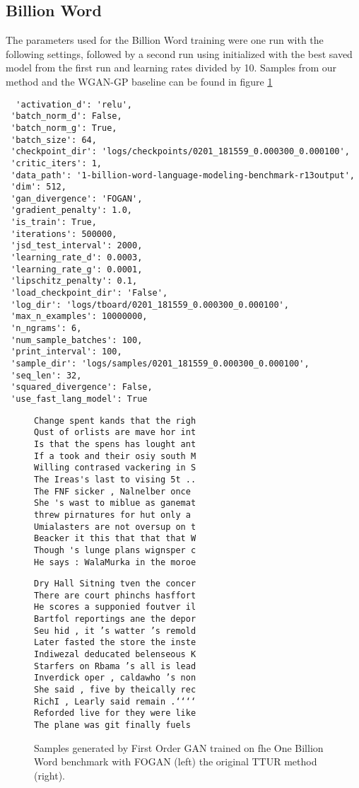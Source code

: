 \documentclass{article}
\begin{document}
 \subsection{Billion Word}\label{SS:appendix_billion_words}
 The parameters used for the Billion Word training were one run with the following settings, followed by
 a second run using initialized with the best saved model from the first run and learning rates divided by 10.
 Samples from our method and the WGAN-GP baseline can be found in figure \ref{F:billion_samples}
 
 \begin{verbatim}
  'activation_d': 'relu',
 'batch_norm_d': False,
 'batch_norm_g': True,
 'batch_size': 64,
 'checkpoint_dir': 'logs/checkpoints/0201_181559_0.000300_0.000100',
 'critic_iters': 1,
 'data_path': '1-billion-word-language-modeling-benchmark-r13output',
 'dim': 512,
 'gan_divergence': 'FOGAN',
 'gradient_penalty': 1.0,
 'is_train': True,
 'iterations': 500000,
 'jsd_test_interval': 2000,
 'learning_rate_d': 0.0003,
 'learning_rate_g': 0.0001,
 'lipschitz_penalty': 0.1,
 'load_checkpoint_dir': 'False',
 'log_dir': 'logs/tboard/0201_181559_0.000300_0.000100',
 'max_n_examples': 10000000,
 'n_ngrams': 6,
 'num_sample_batches': 100,
 'print_interval': 100,
 'sample_dir': 'logs/samples/0201_181559_0.000300_0.000100',
 'seq_len': 32,
 'squared_divergence': False,
 'use_fast_lang_model': True
 \end{verbatim}


\begin{figure}
\centering
\begin{minipage}[b]{.5\linewidth}
\begin{verbatim}
Change spent kands that the righ
Qust of orlists are mave hor int
Is that the spens has lought ant
If a took and their osiy south M
Willing contrased vackering in S
The Ireas's last to vising 5t ..
The FNF sicker , Nalnelber once 
She 's wast to miblue as ganemat
threw pirnatures for hut only a 
Umialasters are not oversup on t
Beacker it this that that that W
Though 's lunge plans wignsper c
He says : WalaMurka in the moroe
\end{verbatim} 
\end{minipage}\begin{minipage}[b]{.5\linewidth}
\begin{verbatim}
Dry Hall Sitning tven the concer
There are court phinchs hasffort
He scores a supponied foutver il
Bartfol reportings ane the depor
Seu hid , it ’s watter ’s remold
Later fasted the store the inste
Indiwezal deducated belenseous K
Starfers on Rbama ’s all is lead
Inverdick oper , caldawho ’s non
She said , five by theically rec
RichI , Learly said remain .‘‘‘‘
Reforded live for they were like
The plane was git finally fuels
\end{verbatim} 
\end{minipage}
\caption{Samples generated by First Order GAN trained on fhe One Billion Word benchmark with FOGAN
(left) the original TTUR method (right).}\label{F:billion_samples}
\end{figure}\clearpage{}
\end{document}
